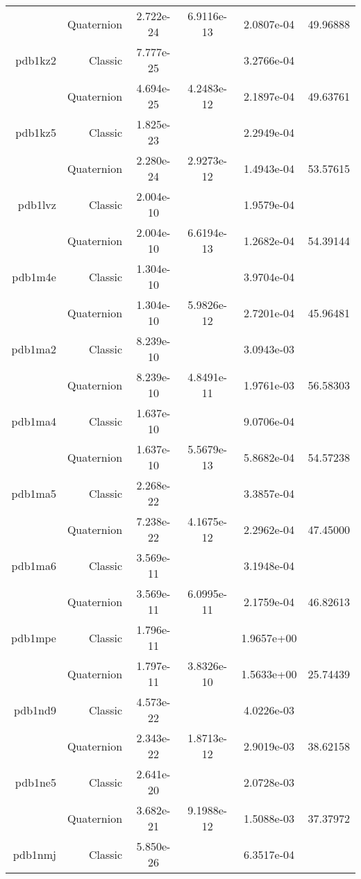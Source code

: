 \begin{xltabular}{\textwidth}{r|rS[table-format=1.3e+2]S[table-format=1.4e+2]S[table-format=1.4e+2]S[table-format=-1.5]}
& Quaternion & 2.722e-24 & 6.9116e-13 & 2.0807e-04 & 49.96888\\  \addlinespace
pdb1kz2 & Classic & 7.777e-25 &  & 3.2766e-04 & \\
& Quaternion & 4.694e-25 & 4.2483e-12 & 2.1897e-04 & 49.63761\\  \addlinespace
pdb1kz5 & Classic & 1.825e-23 &  & 2.2949e-04 & \\
& Quaternion & 2.280e-24 & 2.9273e-12 & 1.4943e-04 & 53.57615\\  \addlinespace
pdb1lvz & Classic & 2.004e-10 &  & 1.9579e-04 & \\
& Quaternion & 2.004e-10 & 6.6194e-13 & 1.2682e-04 & 54.39144\\  \addlinespace
pdb1m4e & Classic & 1.304e-10 &  & 3.9704e-04 & \\
& Quaternion & 1.304e-10 & 5.9826e-12 & 2.7201e-04 & 45.96481\\  \addlinespace
pdb1ma2 & Classic & 8.239e-10 &  & 3.0943e-03 & \\
& Quaternion & 8.239e-10 & 4.8491e-11 & 1.9761e-03 & 56.58303\\  \addlinespace
pdb1ma4 & Classic & 1.637e-10 &  & 9.0706e-04 & \\
& Quaternion & 1.637e-10 & 5.5679e-13 & 5.8682e-04 & 54.57238\\  \addlinespace
pdb1ma5 & Classic & 2.268e-22 &  & 3.3857e-04 & \\
& Quaternion & 7.238e-22 & 4.1675e-12 & 2.2962e-04 & 47.45000\\  \addlinespace
pdb1ma6 & Classic & 3.569e-11 &  & 3.1948e-04 & \\
& Quaternion & 3.569e-11 & 6.0995e-11 & 2.1759e-04 & 46.82613\\  \addlinespace
pdb1mpe & Classic & 1.796e-11 &  & 1.9657e+00 & \\
& Quaternion & 1.797e-11 & 3.8326e-10 & 1.5633e+00 & 25.74439\\  \addlinespace
pdb1nd9 & Classic & 4.573e-22 &  & 4.0226e-03 & \\
& Quaternion & 2.343e-22 & 1.8713e-12 & 2.9019e-03 & 38.62158\\  \addlinespace
pdb1ne5 & Classic & 2.641e-20 &  & 2.0728e-03 & \\
& Quaternion & 3.682e-21 & 9.1988e-12 & 1.5088e-03 & 37.37972\\  \addlinespace
pdb1nmj & Classic & 5.850e-26 &  & 6.3517e-04 & \\

\end{xltabular}
